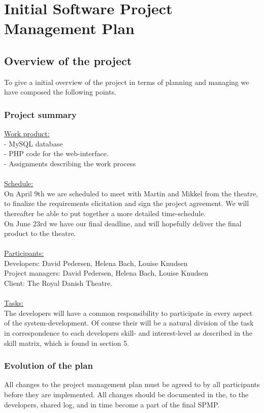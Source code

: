 \documentclass[12pt]{article}
\begin{document}
\section{Initial Software Project Management Plan}
\subsection{Overview of the project}
To give a initial overview of the project in terms of planning and managing we have composed the following points.
\subsubsection{Project summary}
\underline{Work product:} \\
- MySQL database \\
- PHP code for the web-interface. \\
- Assignments describing the work process\\\\
\underline{Schedule:} \\
On April 9th we are scheduled to meet with Martin and Mikkel from the theatre, to finalize the requirements elicitation and sign the project agreement. We will thereafter be able to put together a more detailed time-schedule.\\
On June 23rd we have our final deadline, and will hopefully deliver the final product to the theatre. \\\\
\underline{Participants:}\\
Developers: David Pedersen, Helena Bach, Louise Knudsen \\
Project managers: David Pedersen, Helena Bach, Louise Knudsen \\
Client: The Royal Danish Theatre.\\\\
\underline{Tasks:} \\
The developers will have a common responsibility to participate in every aspect of the system-development. Of course their will be a natural division of the task in correspondence to each developers skill- and interest-level as described in the skill matrix, which is found in section 5. 
\subsubsection{Evolution of the plan}
All changes to the project management plan must be agreed to by all participants before they are implemented. All changes should be documented in the, to the developers, shared log, and in time become a part of the final SPMP.
\end{document}
